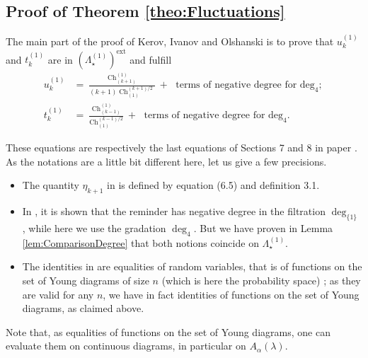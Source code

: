 \documentclass[11pt]{amsart}
\theoremstyle{plain}
\theoremstyle{remark}
\newcommand{\Polun}{\Lambda_\star^{(1)}}
\newcommand{\Poluext}{\left(\Lambda_\star^{(1)}\right)^{\ext}}
\DeclareMathOperator{\Ch}{Ch}
\DeclareMathOperator{\ext}{ext}
\begin{document}
\subsection{Proof of Theorem \ref{theo:Fluctuations}}

The main part of the proof of Kerov, Ivanov and Olshanski
is to prove that
$u_k^{(1)}$ and $t_k^{(1)}$ are in $\Poluext$ and fulfill
\begin{align}
    u_{k}^{(1)} &= \frac{\Ch^{(1)}_{(k+1)}}{(k+1) \Ch_{(1)}^{(k+1)/2}} +\text{ terms of negative degree for $\deg_4$;}
    \label{eq:FromIO_u}\\
    t_{k}^{(1)} &= \frac{\Ch^{(1)}_{(k-1)}}{\Ch_{(1)}^{(k-1)/2}} +\text{ terms of negative degree for $\deg_4$.}
    \label{eq:FromIO_t}
\end{align}

These equations are respectively the last equations of Sections 7 and 8 in paper \cite{IvanovOlshanski2002}.
As the notations are a little bit different here, let us give a few precisions.
\begin{itemize}
    \item The quantity $\eta_{k+1}$ in \cite{IvanovOlshanski2002} is
        defined by equation (6.5) and definition 3.1.
    \item In \cite{IvanovOlshanski2002}, it is shown that the reminder
        has negative degree in the filtration $\deg_{\{1\}}$, while here we use the gradation $\deg_4$.
        But we have proven in Lemma \ref{lem:ComparisonDegree} that both notions coincide on $\Polun$.
    \item The identities in \cite{IvanovOlshanski2002} are equalities of random
        variables, that is of functions on the set of Young diagrams
        of size $n$ (which is here the probability space) ;
        as they are valid for any $n$, we have in fact
        identities of functions on the set of Young diagrams, as claimed above.
\end{itemize}
Note that, as equalities of functions on the set of Young diagrams,
one can evaluate them on continuous diagrams, in particular on $A_\alpha(\lambda)$.
\end{document}
